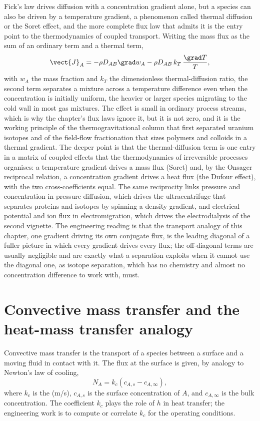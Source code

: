 \begin{mastery}
Fick's law drives diffusion with a concentration gradient alone, but a species
can also be driven by a temperature gradient, a phenomenon called thermal
diffusion or the Soret effect, and the more complete flux law that admits it is
the entry point to the thermodynamics of coupled transport. Writing the mass
flux as the sum of an ordinary term and a thermal term,
\[
\vect{J}_A = -\rho D_{AB}\grad w_A - \rho D_{AB}\,k_T\,\frac{\grad T}{T},
\]
with $w_A$ the mass fraction and $k_T$ the dimensionless thermal-diffusion
ratio, the second term separates a mixture across a temperature difference even
when the concentration is initially uniform, the heavier or larger species
migrating to the cold wall in most gas mixtures. The effect is small in ordinary
process streams, which is why the chapter's flux laws ignore it, but it is not
zero, and it is the working principle of the thermogravitational column that
first separated uranium isotopes and of the field-flow fractionation that sizes
polymers and colloids in a thermal gradient. The deeper point is that the
thermal-diffusion term is one entry in a matrix of coupled effects that the
thermodynamics of irreversible processes organises: a temperature gradient
drives a mass flux (Soret) and, by the Onsager reciprocal relation, a
concentration gradient drives a heat flux (the Dufour effect), with the two
cross-coefficients equal. The same reciprocity links pressure and concentration
in pressure diffusion, which drives the ultracentrifuge that separates proteins
and isotopes by spinning a density gradient, and electrical potential and ion
flux in electromigration, which drives the electrodialysis of the second
vignette. The engineering reading is that the transport analogy of this chapter,
one gradient driving its own conjugate flux, is the leading diagonal of a fuller
picture in which every gradient drives every flux; the off-diagonal terms are
usually negligible and are exactly what a separation exploits when it cannot use
the diagonal one, as isotope separation, which has no chemistry and almost no
concentration difference to work with, must.
\end{mastery}

\section{Convective mass transfer and the heat-mass transfer analogy}

Convective mass transfer is the transport of a species between a
surface and a moving fluid in contact with it. The flux at the
surface is given, by analogy to Newton's law of cooling,
\[
N_A = k_c (c_{A,s} - c_{A,\infty}),
\]
where $k_c$ is the  (m/s), $c_{A,s}$
is the surface concentration of $A$, and $c_{A,\infty}$ is the bulk
concentration. The coefficient $k_c$ plays the role of $h$ in heat
transfer; the engineering work is to compute or correlate $k_c$ for
the operating conditions.


